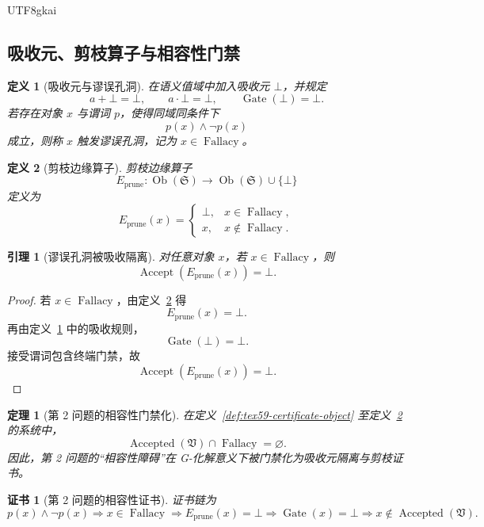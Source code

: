 \documentclass[12pt]{article}
\newtheorem{definition}{定义}[section]
\newtheorem{theorem}{定理}[section]
\newtheorem{lemma}{引理}[section]
\newtheorem{Certificate}{证书}[section]
\newcommand{\Vsys}{\mathfrak V}
\DeclareMathOperator{\Ob}{Ob}
\DeclareMathOperator{\Accept}{Accept}
\DeclareMathOperator{\Accepted}{Accepted}
\DeclareMathOperator{\Fallacy}{Fallacy}
\DeclareMathOperator{\Gate}{Gate}
\begin{document}
\begin{CJK*}{UTF8}{gkai}
\subsection{吸收元、剪枝算子与相容性门禁}
\label{subsec:tex59-consistency}

\begin{definition}[吸收元与谬误孔洞]
\label{def:tex59-bottom-fallacy}
在语义值域中加入吸收元 \(\bot\)，并规定
\[
  a+\bot=\bot,\qquad
  a\cdot\bot=\bot,\qquad
  \Gate(\bot)=\bot.
\]
若存在对象 \(x\) 与谓词 \(p\)，使得同域同条件下
\[
  p(x)\wedge \neg p(x)
\]
成立，则称 \(x\) 触发谬误孔洞，记为 \(x\in\Fallacy\)。
\end{definition}

\begin{definition}[剪枝边缘算子]
\label{def:tex59-prune}
剪枝边缘算子
\[
  E_{\mathrm{prune}}:\Ob(\mathfrak S)\longrightarrow \Ob(\mathfrak S)\cup\{\bot\}
\]
定义为
\[
  E_{\mathrm{prune}}(x)=
  \begin{cases}
  \bot, & x\in\Fallacy,\\
  x, & x\notin\Fallacy.
  \end{cases}
\]
\end{definition}

\begin{lemma}[谬误孔洞被吸收隔离]
\label{lem:tex59-fallacy-absorbed}
对任意对象 \(x\)，若 \(x\in\Fallacy\)，则
\[
  \Accept(E_{\mathrm{prune}}(x))=\bot.
\]
\end{lemma}

\begin{proof}
若 \(x\in\Fallacy\)，由定义~\ref{def:tex59-prune} 得
\[
  E_{\mathrm{prune}}(x)=\bot.
\]
再由定义~\ref{def:tex59-bottom-fallacy} 中的吸收规则，
\[
  \Gate(\bot)=\bot.
\]
接受谓词包含终端门禁，故
\[
  \Accept(E_{\mathrm{prune}}(x))=\bot.
\]
\end{proof}

\begin{theorem}[第 2 问题的相容性门禁化]
\label{thm:tex59-consistency-gate}
在定义~\ref{def:tex59-certificate-object} 至定义~\ref{def:tex59-prune} 的系统中，
\[
  \Accepted(\Vsys)\cap \Fallacy=\varnothing.
\]
因此，第 2 问题的“相容性障碍”在 G-化解意义下被门禁化为吸收元隔离与剪枝证书。
\end{theorem}

\begin{Certificate}[第 2 问题的相容性证书]
\label{cert:tex59-consistency}
证书链为
\[
  p(x)\wedge\neg p(x)
  \Longrightarrow
  x\in\Fallacy
  \Longrightarrow
  E_{\mathrm{prune}}(x)=\bot
  \Longrightarrow
  \Gate(x)=\bot
  \Longrightarrow
  x\notin\Accepted(\Vsys).
\]
\end{Certificate}


\end{CJK*}
\end{document}
